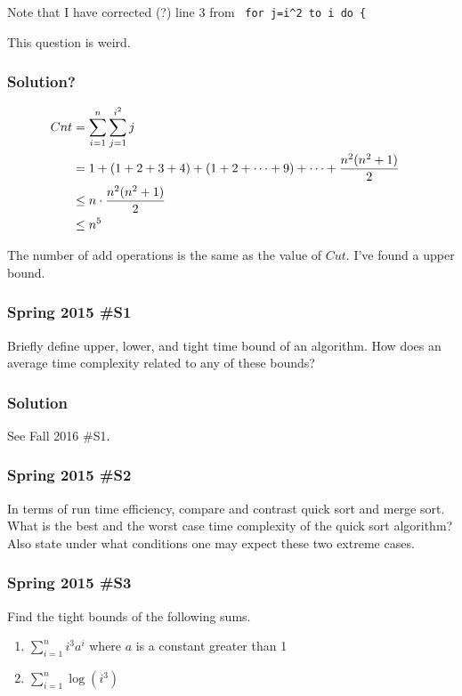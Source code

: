 	Note that I have corrected (?) line 3 from \ \verb|for j=i^2 to i do {|
	
	This question is weird.  
	
\subsubsection{Solution?}

\begin{align*}
	Cnt &= \sum_{i=1}^n \sum_{j=1}^{i^2} j \cr
		&= 1 + (1+2+3+4) + (1 + 2 + \cdots + 9) + \cdots + \frac{n^2(n^2+1)}{2} \cr
		&\le n \cdot \frac{n^2(n^2+1)}{2} \cr
		&\le n^5 \cr
\end{align*}

The number of add operations is the same as the value of $Cut$.  I've found a upper bound.  

\subsubsection{Spring 2015 \#S1}
	Briefly define upper, lower, and tight time bound of an algorithm.  How does an average time complexity related to any of these bounds?
	
\subsubsection{Solution}

See Fall 2016 \#S1.  
	
\subsubsection{Spring 2015 \#S2}
	In terms of run time efficiency, compare and contrast quick sort and merge sort.  What is the best and the worst case time complexity of the quick sort algorithm?  Also state under what conditions one may expect these two extreme cases.
	
\subsubsection{Spring 2015 \#S3}
	Find the tight bounds of the following sums.  
	\begin{enumerate}
		\item $\displaystyle \sum_{i=1}^n i^3 a^i$ where $a$ is a constant greater than 1
		\item $\displaystyle \sum_{i=1}^n \log (i^3)$ 
	\end{enumerate}
	

